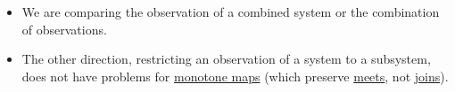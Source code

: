 \begin{itemize}
  \item  We are comparing the observation of a combined system or the combination of observations.
  \item The other direction, restricting an observation of a system to a subsystem, does not have problems for \hyperref[D1.59]{monotone maps} (which preserve \hyperref[D1.81]{meets}, not \hyperref[D1.81]{joins}).

\end{itemize}